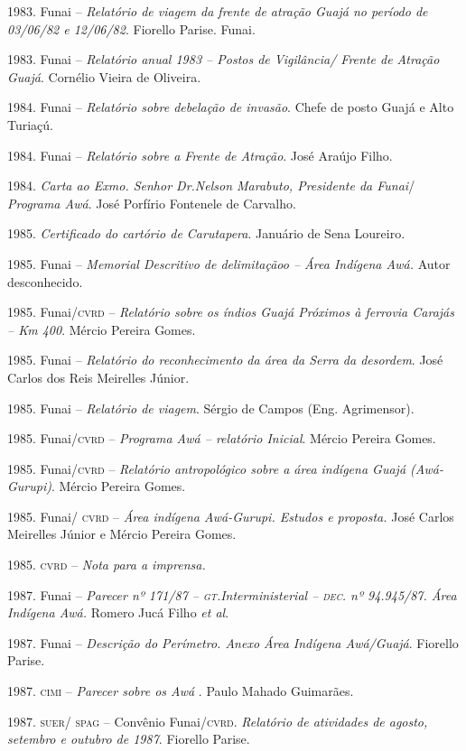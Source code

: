 \begin{bibliohedra}
1983. Funai -- \emph{Relatório de viagem da frente de atração
Guajá no período de 03/06/82 e 12/06/82}. Fiorello Parise. Funai.

1983. Funai -- \emph{Relatório anual 1983 -- Postos de
Vigilância/ Frente de Atração Guajá}. Cornélio Vieira de Oliveira.

1984. Funai -- \emph{Relatório sobre debelação de invasão}.
Chefe de posto Guajá e Alto Turiaçú.

1984. Funai -- \emph{Relatório sobre a Frente de Atração}. José
Araújo Filho.

1984. \emph{Carta ao Exmo. Senhor Dr.Nelson Marabuto,
Presidente da Funai}/ \emph{Programa Awá}. José Porfírio Fontenele de
Carvalho.

1985. \emph{Certificado do cartório de Carutapera}. Januário de
Sena Loureiro.

1985. Funai -- \emph{Memorial Descritivo de delimitaçãoo --
Área Indígena Awá.} Autor desconhecido.

1985. Funai/\textsc{cvrd} -- \emph{Relatório sobre os índios Guajá
Próximos à ferrovia Carajás -- Km 400}. Mércio Pereira Gomes.

1985. Funai -- \emph{Relatório do reconhecimento da área da
Serra da desordem}. José Carlos dos Reis Meirelles Júnior.

1985. Funai -- \emph{Relatório de viagem}. Sérgio de Campos
(Eng. Agrimensor).

1985. Funai/\textsc{cvrd} -- \emph{Programa Awá -- relatório Inicial}.
Mércio Pereira Gomes.

1985. Funai/\textsc{cvrd} -- \emph{Relatório antropológico sobre a área
indígena Guajá (Awá-Gurupi)}. Mércio Pereira Gomes.

1985. Funai/ \textsc{cvrd} -- \emph{Área indígena Awá-Gurupi. Estudos e
proposta.} José Carlos Meirelles Júnior e Mércio Pereira Gomes.

1985. \textsc{cvrd} -- \emph{Nota para a imprensa.}

1987. Funai -- \emph{Parecer nº 171/87 -- \textsc{gt}.Interministerial
-- \textsc{dec}. nº 94.945/87. Área Indígena Awá.} Romero Jucá Filho \emph{et
al}.

1987. Funai -- \emph{Descrição do Perímetro. Anexo Área Indígena
Awá/Guajá}. Fiorello Parise.

1987. \textsc{cimi} -- \emph{Parecer sobre os Awá} . Paulo Mahado
Guimarães.

1987. \textsc{suer}/ \textsc{spag} -- Convênio Funai/\textsc{cvrd}. \emph{Relatório de
atividades de agosto, setembro e outubro de 1987}. Fiorello Parise.


\end{bibliohedra}
